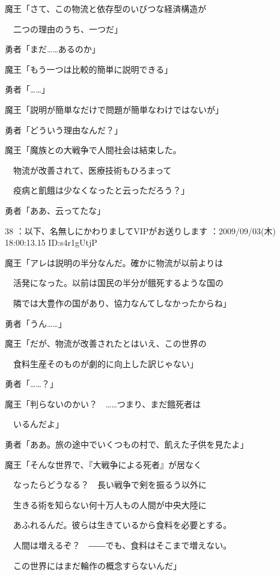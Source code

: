 \documentclass[a4j,twocolumn]{tarticle}
\begin{document}
魔王「さて、この物流と依存型のいびつな経済構造が\par{} 
　二つの理由のうち、一つだ」 



勇者「まだ……あるのか」 



魔王「もう一つは比較的簡単に説明できる」\par{} 
勇者「……」\par{} 
魔王「説明が簡単なだけで問題が簡単なわけではないが」 



勇者「どういう理由なんだ？」 



魔王「魔族との大戦争で人間社会は結束した。\par{} 
　物流が改善されて、医療技術もひろまって\par{}
　疫病と飢餓は少なくなったと云っただろう？」 



勇者「ああ、云ってたな」 

	
    
    
    
38 ：以下、名無しにかわりましてVIPがお送りします ：2009/09/03(木) 18:00:13.15 ID:s4r1gUtjP 


魔王「アレは説明の半分なんだ。確かに物流が以前よりは \par{}
　活発になった。以前は国民の半分が餓死するような国の \par{}
　隣では大豊作の国があり、協力なんてしなかったからね」\par{} 
勇者「うん……」 



魔王「だが、物流が改善されたとはいえ、この世界の\par{} 
　食料生産そのものが劇的に向上した訳じゃない」 



勇者「……？」 



魔王「判らないのかい？　……つまり、まだ餓死者は\par{} 
　いるんだよ」 



勇者「ああ。旅の途中でいくつもの村で、飢えた子供を見たよ」 



魔王「そんな世界で、『大戦争による死者』が居なく\par{} 
　なったらどうなる？　長い戦争で剣を振るう以外に\par{} 
　生きる術を知らない何十万人もの人間が中央大陸に\par{} 
　あふれるんだ。彼らは生きているから食料を必要とする。\par{} 
　人間は増えるぞ？　――でも、食料はそこまで増えない。\par{} 
　この世界にはまだ輪作の概念すらないんだ」 
\end{document}

